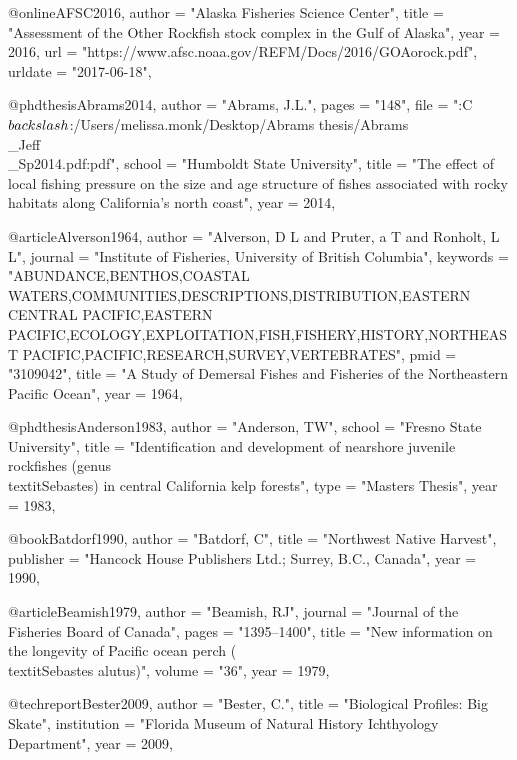 @online{AFSC2016,
    author = "{Alaska Fisheries Science Center}",
    title = "{{Assessment of the Other Rockfish stock complex in the Gulf of Alaska}}",
    year = 2016,
    url = "{https://www.afsc.noaa.gov/REFM/Docs/2016/GOAorock.pdf}",
    urldate = "{2017-06-18}",
}

@phdthesis{Abrams2014,
    author = "{Abrams, J.L.}",
    pages = "{148}",
    file = "{:C$\\backslash$:/Users/melissa.monk/Desktop/Abrams thesis/Abrams\\_Jeff\\_Sp2014.pdf:pdf}",
    school = "{Humboldt State University}",
    title = "{{The effect of local fishing pressure on the size and age structure of fishes associated with rocky habitats along California's north coast}}",
    year = 2014,
}

@article{Alverson1964,
    author = "{Alverson, D L and Pruter, a T and Ronholt, L L}",
    journal = "{Institute of Fisheries, University of British Columbia}",
    keywords = "{ABUNDANCE,BENTHOS,COASTAL WATERS,COMMUNITIES,DESCRIPTIONS,DISTRIBUTION,EASTERN CENTRAL PACIFIC,EASTERN PACIFIC,ECOLOGY,EXPLOITATION,FISH,FISHERY,HISTORY,NORTHEAST PACIFIC,PACIFIC,RESEARCH,SURVEY,VERTEBRATES}",
    pmid = "{3109042}",
    title = "{{A Study of Demersal Fishes and Fisheries of the Northeastern Pacific Ocean}}",
    year = 1964,
}

@phdthesis{Anderson1983,
    author = "{Anderson, TW}",
    school = "{Fresno State University}",
    title = "{{Identification and development of nearshore juvenile rockfishes (genus \\textit{{Sebastes}}) in central California kelp forests}}",
    type = "{Masters Thesis}",
    year = 1983,
}

@book{Batdorf1990,
    author = "{Batdorf, C}",
    title = "{Northwest Native Harvest}",
    publisher = "{Hancock House Publishers Ltd.; Surrey, B.C., Canada}",
    year = 1990,
}


@article{Beamish1979,
    author = "{Beamish, RJ}",
    journal = "{Journal of the Fisheries Board of Canada}",
    pages = "{1395--1400}",
    title = "{{New information on the longevity of Pacific ocean perch (\\textit{{Sebastes} alutus})}}",
    volume = "{36}",
    year = 1979,
}

@techreport{Bester2009,
    author = "{Bester, C.}",
    title = "{Biological Profiles: Big Skate}",
    institution = "{Florida Museum of Natural History Ichthyology Department}",
    year = 2009,
}

